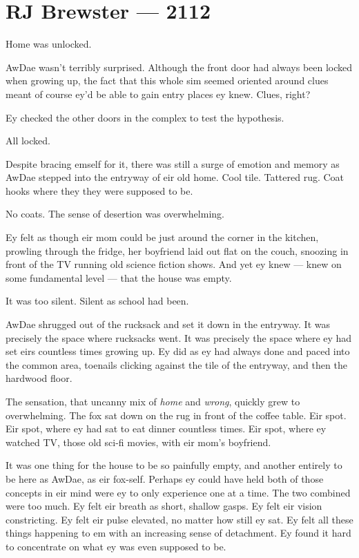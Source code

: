 \hypertarget{rj-brewster-2112}{%
\chapter*{RJ Brewster — 2112}\label{rj-brewster-2112}}

Home was unlocked.

AwDae wasn't terribly surprised. Although the front door had always been locked when growing up, the fact that this whole sim seemed oriented around clues meant of course ey'd be able to gain entry places ey knew. Clues, right?

Ey checked the other doors in the complex to test the hypothesis.

All locked.

Despite bracing emself for it, there was still a surge of emotion and memory as AwDae stepped into the entryway of eir old home. Cool tile. Tattered rug. Coat hooks where they they were supposed to be.

No coats. The sense of desertion was overwhelming.

Ey felt as though eir mom could be just around the corner in the kitchen, prowling through the fridge, her boyfriend laid out flat on the couch, snoozing in front of the TV running old science fiction shows. And yet ey knew — knew on some fundamental level — that the house was empty.

It was too silent. Silent as school had been.

AwDae shrugged out of the rucksack and set it down in the entryway. It was precisely the space where rucksacks went. It was precisely the space where ey had set eirs countless times growing up. Ey did as ey had always done and paced into the common area, toenails clicking against the tile of the entryway, and then the hardwood floor.

The sensation, that uncanny mix of \emph{home} and \emph{wrong}, quickly grew to overwhelming. The fox sat down on the rug in front of the coffee table. Eir spot. Eir spot, where ey had sat to eat dinner countless times. Eir spot, where ey watched TV, those old sci-fi movies, with eir mom's boyfriend.

It was one thing for the house to be so painfully empty, and another entirely to be here as AwDae, as eir fox-self. Perhaps ey could have held both of those concepts in eir mind were ey to only experience one at a time. The two combined were too much. Ey felt eir breath as short, shallow gasps. Ey felt eir vision constricting. Ey felt eir pulse elevated, no matter how still ey sat. Ey felt all these things happening to em with an increasing sense of detachment. Ey found it hard to concentrate on what ey was even supposed to be.

